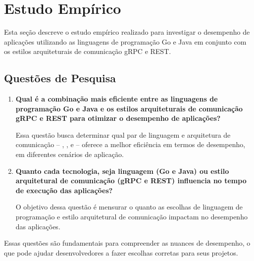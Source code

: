 \section{Estudo Empírico}
\label{sec:estudoempirico}

Esta seção descreve o estudo empírico realizado para investigar o desempenho de aplicações utilizando as linguagens de programação Go e Java em conjunto com os estilos arquiteturais de comunicação gRPC e REST.

\subsection{Questões de Pesquisa}

\begin{enumerate}
    \item \textbf{Qual é a combinação mais eficiente entre as linguagens de programação Go e Java e os estilos arquiteturais de comunicação gRPC e REST para otimizar o desempenho de aplicações?}
    
    Essa questão busca determinar qual par de linguagem e arquitetura de comunicação -- \gogrpc{}, \gorest{}, \javagrpc{} e \javarest{} -- oferece a melhor eficiência em termos de desempenho, em diferentes cenários de aplicação.
    
    \item \textbf{Quanto cada tecnologia, seja linguagem (Go e Java) ou estilo arquitetural de comunicação (gRPC e REST) influencia no tempo de execução das aplicações?}
    
    O objetivo dessa questão é mensurar o quanto as escolhas de linguagem de programação e estilo arquitetural de comunicação impactam no desempenho das aplicações.
\end{enumerate}

Essas questões são fundamentais para compreender as nuances de desempenho, o que pode ajudar desenvolvedores a fazer escolhas corretas para seus projetos.

